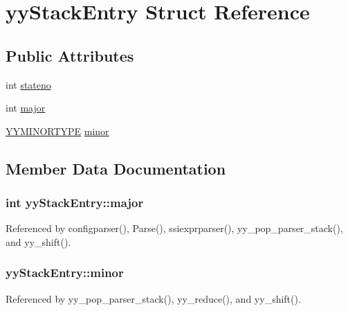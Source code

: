 \hypertarget{structyyStackEntry}{\section{yy\-Stack\-Entry Struct Reference}
\label{structyyStackEntry}
}
\subsection*{Public Attributes}
\begin{DoxyCompactItemize}
\item 
int \hyperlink{structyyStackEntry_afc9067f0daf86863e10c7c4000cba1ad}{stateno}
\item 
int \hyperlink{structyyStackEntry_a74c3d34bcbe5fdbf370d8558c8cca068}{major}
\item 
\hyperlink{unionYYMINORTYPE}{Y\-Y\-M\-I\-N\-O\-R\-T\-Y\-P\-E} \hyperlink{structyyStackEntry_a024e1e64bce5945080629a2dd8d1bb4f}{minor}
\end{DoxyCompactItemize}


\subsection{Member Data Documentation}
\hypertarget{structyyStackEntry_a74c3d34bcbe5fdbf370d8558c8cca068}{
\subsubsection[{major}]{\setlength{\rightskip}{0pt plus 5cm}int yy\-Stack\-Entry\-::major}}\label{structyyStackEntry_a74c3d34bcbe5fdbf370d8558c8cca068}


Referenced by configparser(), Parse(), ssiexprparser(), yy\-\_\-pop\-\_\-parser\-\_\-stack(), and yy\-\_\-shift().

\hypertarget{structyyStackEntry_a024e1e64bce5945080629a2dd8d1bb4f}{
\subsubsection[{minor}]{ yy\-Stack\-Entry\-::minor}}\label{structyyStackEntry_a024e1e64bce5945080629a2dd8d1bb4f}


Referenced by yy\-\_\-pop\-\_\-parser\-\_\-stack(), yy\-\_\-reduce(), and yy\-\_\-shift().

